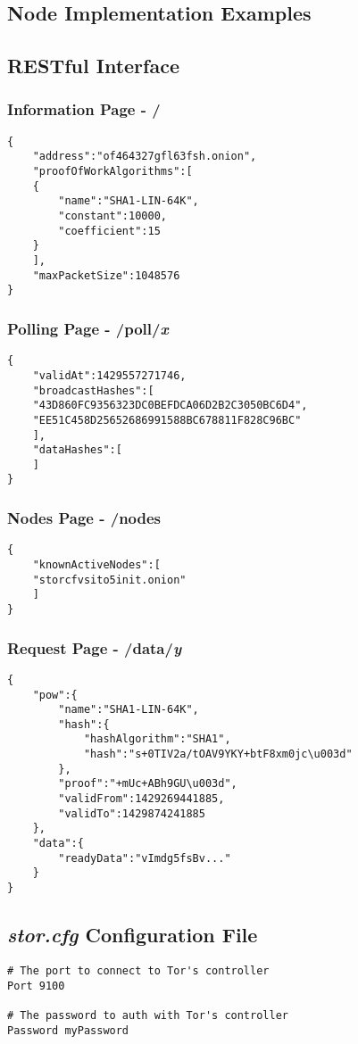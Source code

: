 \begin{landscape}
	\section{Node Implementation Examples}
	\subsection{RESTful Interface}
	\subsubsection*{Information Page - /}
	\begin{lstlisting}
{  
	"address":"of464327gfl63fsh.onion",
	"proofOfWorkAlgorithms":[  
	{  
		"name":"SHA1-LIN-64K",
		"constant":10000,
		"coefficient":15
	}
	],
	"maxPacketSize":1048576
}
	\end{lstlisting}
	\subsubsection*{Polling Page - /poll/\textit{x}}
	\begin{lstlisting}
{  
	"validAt":1429557271746,
	"broadcastHashes":[  
	"43D860FC9356323DC0BEFDCA06D2B2C3050BC6D4",
	"EE51C458D25652686991588BC678811F828C96BC"
	],
	"dataHashes":[  
	]
}
	\end{lstlisting}
	\subsubsection*{Nodes Page - /nodes}
	\begin{lstlisting}
{  
	"knownActiveNodes":[  
	"storcfvsito5init.onion"
	]
}
	\end{lstlisting}
	\subsubsection*{Request Page - /data/\textit{y}}
	\begin{lstlisting}
{  
	"pow":{  
		"name":"SHA1-LIN-64K",
		"hash":{  
			"hashAlgorithm":"SHA1",
			"hash":"s+0TIV2a/tOAV9YKY+btF8xm0jc\u003d"
		},
		"proof":"+mUc+ABh9GU\u003d",
		"validFrom":1429269441885,
		"validTo":1429874241885
	},
	"data":{  
		"readyData":"vImdg5fsBv..."
	}
}
	\end{lstlisting}
	
	\subsection{\textit{stor.cfg} Configuration File}
		\begin{lstlisting}
# The port to connect to Tor's controller
Port 9100

# The password to auth with Tor's controller
Password myPassword
		\end{lstlisting}
\end{landscape}